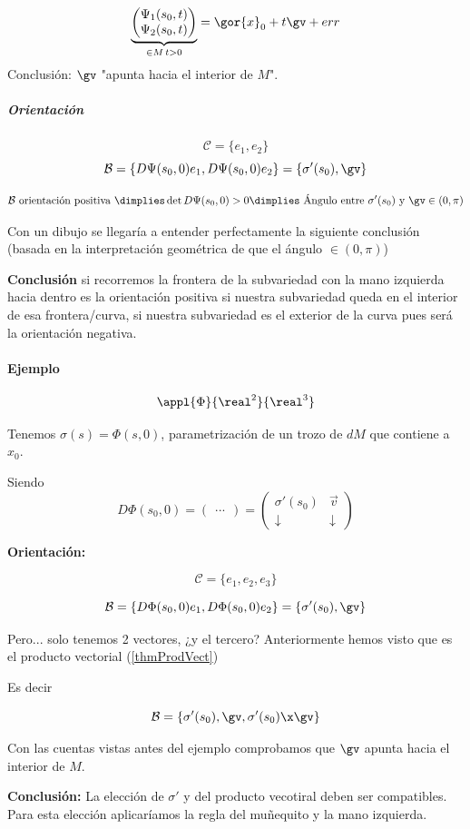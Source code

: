\[\underbrace{\begin{pmatrix}\Psi_1(s_0,t)\\
\Psi_2(s_0,t)
\end{pmatrix} }_{\in M\, t>0}= \gor{x}_0 + t\gv + err
\]
Conclusión: $\gv$ "apunta hacia el interior de $M$".

\subparagraph{Orientación}
\[\mathcal{C} = \{e_1,e_2\}\]
\[\mathcal{B} = \{D\Psi(s_0,0)e_1,D\Psi(s_0,0)e_2\} = \{\sigma'(s_0),\gv\}\]

\[\mathcal{B} \text{ orientación positiva } \dimplies \det D\Psi(s_0,0) > 0 \dimplies \text{ Ángulo entre } \sigma'(s_0) \text{ y } \gv \in (0,\pi)\]

Con un dibujo se llegaría a entender perfectamente  la siguiente conclusión (basada en la interpretación geométrica de que el ángulo $\in (0,\pi)$)

\textbf{Conclusión} si recorremos la frontera de la subvariedad	 con la mano izquierda hacia dentro es la orientación positiva si nuestra subvariedad queda en el interior de esa frontera/curva, si nuestra subvariedad es el exterior de la curva pues será la orientación negativa.

\paragraph{Ejemplo}

\[\appl{\Phi}{\real^2}{\real^3}\]

Tenemos $\sigma(s) = \Phi(s,0) $, parametrización de un trozo de $dM$ que contiene a $x_0$.

Siendo \[D\Phi(s_0,0) = \begin{pmatrix}
...
\end{pmatrix} = \begin{pmatrix}
\sigma'(s_0) & \overrightarrow{v}\\
\downarrow & \downarrow
\end{pmatrix}\]

\textbf{Orientación:}

\[\mathcal{C}  = \{e_1,e_2,e_3\}\]

\[\mathcal{B} = \{D\Phi(s_0,0)e_1,D\Phi(s_0,0)e_2\} = \{\sigma'(s_0),\gv\}\]

Pero... solo tenemos 2 vectores, ¿y el tercero? Anteriormente hemos visto que es el producto vectorial (\ref{thmProdVect})

Es decir

\[\mathcal{B} = \{\sigma'(s_0),\gv,\sigma'(s_0)\x\gv\}\]

Con las cuentas vistas antes del ejemplo comprobamos que $\gv$ apunta hacia el interior de $M$.

\textbf{Conclusión:} La elección de $\sigma'$ y del producto vecotiral deben ser compatibles. Para esta elección aplicaríamos la regla del muñequito y la mano izquierda.


